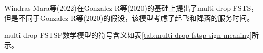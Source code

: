 %
%
%

Windras Mara等(2022)\cite{windrasmaraAdaptiveLargeNeighborhood2022}在Gonzalez-R等(2020)\cite{gonzalez-rTruckdroneTeamLogistics2020}的基础上提出了multi-drop FSTS，但是不同于Gonzalez-R等(2020)\cite{gonzalez-rTruckdroneTeamLogistics2020}的假设，该模型考虑了起飞和降落的服务时间。

multi-drop FSTSP数学模型的符号含义如表\ref{tab:multi-drop-fstsp-sign-meaning}所示。

